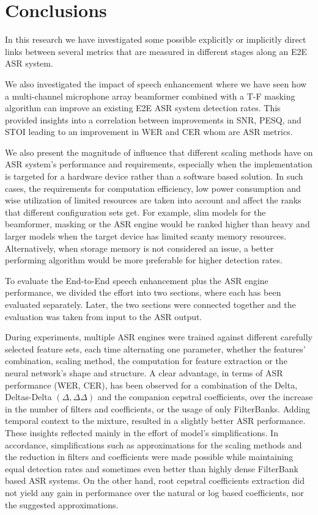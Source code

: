 \chapter{Conclusions}
\vspace{-1cm}
In this research we have 
investigated some possible 
explicitly or implicitly direct links
between
several metrics that are measured 
in different stages along an E2E ASR system.

\bigskip

We also investigated the 
impact of speech enhancement 
where we have seen how
a multi-channel microphone array beamformer
combined with a T-F masking algorithm
can improve an existing E2E ASR system detection rates.
This provided insights into a correlation 
between improvements in SNR, PESQ, and STOI
leading 
to an improvement in WER and CER whom
are ASR metrics.

\bigskip

We also present 
the magnitude of influence
that different scaling methods have 
on ASR system's performance and requirements,
especially when the implementation is targeted for
a hardware device rather than a software based solution.
In such cases, the requirements for
computation efficiency, low power consumption
and wise utilization of limited resources
are taken into account and affect the 
ranks that different configuration sets
get. For example, slim models for the
beamformer, masking or the ASR engine 
would be ranked higher than heavy and 
larger models
when the target device has limited
scanty memory resources. 
Alternatively, when storage memory is
not considered an issue, a better performing
algorithm would be more preferable
for higher detection rates.

\bigskip

To evaluate the End-to-End speech enhancement
plus the ASR engine performance, we divided
the effort into two sections, where each has been
evaluated separately. Later, the two sections 
were connected together and the evaluation was
taken from input to the ASR output.

\bigskip

During experiments,
multiple ASR engines were trained against
different carefully selected feature sets,
each time alternating one parameter,
whether the features' combination,
scaling method, the computation for feature extraction
or the neural network's shape and structure.
A clear advantage, 
in terms of ASR performance (WER, CER), 
has been observed for a combination of the
Delta, Deltas-Delta \((\Delta, \Delta\Delta)\) 
and the companion
cepstral coefficients, over the increase in the
number of filters and coefficients, 
or the usage of only FilterBanks.
Adding temporal context to the mixture,
resulted in a slightly better ASR performance.
These insights reflected mainly in 
the effort of model's simplifications.
In accordance, simplifications such as
approximations for the scaling methods
and the reduction in filters and coefficients
were made possible while maintaining
equal detection rates and sometimes
even better than highly dense
FilterBank based ASR systems.
On the other hand, root cepstral coefficients
extraction did not yield any gain in performance
over the natural or log based coefficients, nor
the suggested approximations.


